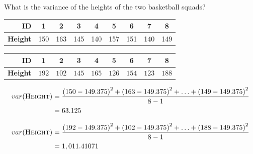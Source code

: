 \documentclass[xcolor={table}]{beamer}
\newcommand{\featN}[1]{\textsc{#1}}
\begin{document}
 \begin{frame} 
\begin{example}
What is the variance of the heights of the two basketball squads?
 		\begin{table}[!htb]
			\label{table:BasketballTeamHeights}
			\centering
			\begin{footnotesize}
			\begin{tabular}{ r | c c c c c c c c}
			\textbf{ID} & 1 & 2 & 3 & 4  & 5 & 6 & 7 & 8 \\
			\hline
			\textbf{Height} & 150 & 163 & 145 & 140 & 157 & 151 & 140 & 149 \\
			\end{tabular}
			\end{footnotesize}
		\end{table}
		\begin{table}
		\label{table:BasketballTeamHeights2}
		\centering
		\begin{footnotesize}
		\begin{tabular}{ r |  c c c c c c c c }
		\textbf{ID} & 1 & 2 & 3 & 4  & 5 & 6 & 7 & 8 \\
		\hline
		\textbf{Height} & $192$ & $102$ & $145$ & $165$ & $126$ & $154$ & $123$ & $188$ \\
		\end{tabular}
		\end{footnotesize}
		\end{table}
\end{example}
\end{frame} 

\begin{frame} 
\begin{example}
\begin{scriptsize}
\begin{alignat*}{2}
var(\featN{Height}) & =  \frac{\left( 150 - 149.375 \right)^2 + \left(163 - 149.375 \right)^2 + \ldots + \left(149 - 149.375 \right)^2}{8-1} \\ 
 & =  63.125
\end{alignat*}


\begin{alignat*}{2}
var(\featN{Height}) & =  \frac{\left(192 - 149.375 \right)^2 + \left(102 - 149.375 \right)^2 + \ldots + \left(188 - 149.375 \right)^2}{8-1} \\
  & =  1,011.41071
\end{alignat*}
\end{scriptsize}

\end{example}

\end{frame} 
\end{document}
